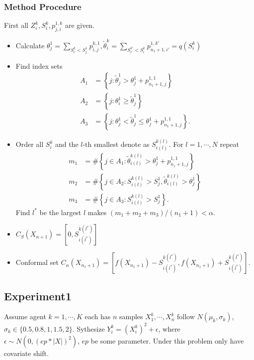 \documentclass[12pt, a4paper, oneside]{article}
\begin{document}
    \subsubsection{Method Procedure}
    First all $Z_i^k,S_i^k,p_{j,i}^{1,k}$ are given.
    \begin{itemize}
        \item Calculate $\theta_j^1=\overset{}{\underset{S_i^k<S_j^1}\sum}p_{i,j}^{k,1},\tilde{\theta}_i^k=\overset{}{\underset{S_{i'}^{k'}<S_i^k}\sum}p_{n_1+1,i'}^{1,k'}=q(S_i^k)$
        \item Find index sets
        \begin{align*}
            A_1&=\left\{ j:\tilde{\theta}_j^1>\theta_j^1+p_{n_1+1,j}^{1,1} \right\}\\
            A_2&=\left\{ j:\theta_i^1\geq\tilde{\theta}_j^1 \right\}\\
            A_3&=\left\{ j:\theta_j^1<\tilde{\theta}_j^1\leq\theta_j^1+p_{n_1+1,j}^{1,1} \right\}.
        \end{align*}
        \item Order all $S_i^k$ and the $l$-th smallest denote as $S_{i(l)}^{k(l)}$. For $l=1,\cdots,N$ repeat
        \begin{align*}
            m_1&=\#\left\{ j\in A_1:\tilde{\theta}_{i(l)}^{k(l)}>\theta_j^1+p_{n_1+1,j}^{1,1} \right\}\\
            m_2&=\#\left\{ j\in A_2:S_{i(l)}^{k(l)}>S_j^1,\tilde{\theta}_{i(l)}^{k(l)}>\theta_j^1 \right\}\\
            m_3&=\#\left\{ j\in A_3:S_{i(l)}^{k(l)}>S_j^1 \right\}.
        \end{align*}
        Find $l^*$ be the largest $l$ makes $(m_1+m_2+m_3)/(n_1+1)<\alpha$.
        \item $C_S(X_{n+1})=[0,S_{i(l^*)}^{k(l^*)}]$
        \item Conformal set $C_\alpha(X_{n_1+1})=[f(X_{n_1+1})-S_{i(l^*)}^{k(l^*)},f(X_{n_1+1})+S_{i(l^*)}^{k(l^*)}]$.
    \end{itemize}


\subsection{Experiment1}
    Assume agent $k=1,\cdots,K$ each has $n$ samples $X_1^k,\cdots,X_n^k$ follow $N(\mu_k,\sigma_k)$, $\sigma_k\in\{0.5,0.8,1,1.5,2\}$. Sythesize $Y_i^k=(X_i^k)^2+\epsilon$, where $\epsilon\sim N(0,(ep*|X|)^2)$, $ep$ be some parameter. Under this problem only have covariate shift.
\end{document}
